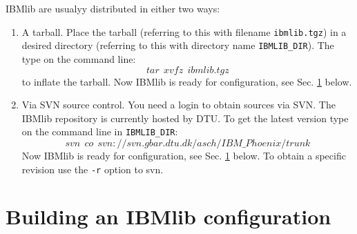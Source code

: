 IBMlib are usualyy distributed in either two ways:
\begin{enumerate}
  \item A tarball. Place the tarball 
        (referring to this with filename {\tt ibmlib.tgz}) in a desired
        directory (referring to this with directory name {\tt IBMLIB\_DIR}).
        The type on the command line:
        \[ tar \ \ xvfz \ \ ibmlib.tgz
        \]
        to inflate the tarball. 
        Now IBMlib is ready for configuration, see Sec. \ref{build:IBMlib} below.
  \item Via SVN source control. You need a login to 
        obtain  sources via SVN. The IBMlib repository is currently hosted by 
        DTU. To get the latest version type on the command line in {\tt IBMLIB\_DIR}:
        \[ svn \ \ co  \ \ svn://svn.gbar.dtu.dk/asch/IBM\_Phoenix/trunk
        \]  
        Now IBMlib is ready for configuration, see Sec. \ref{build:IBMlib} below.
        To obtain a specific revision use the  {\tt -r} option to svn.
\end{enumerate}   

\section{Building an IBMlib configuration}   \label{build:IBMlib}

